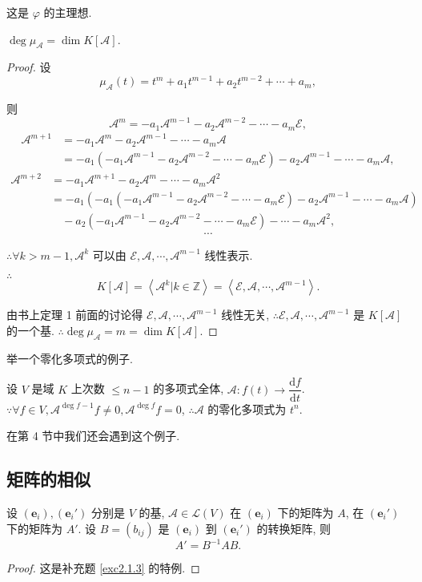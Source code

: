 \documentclass[color=black,device=normal,lang=cn,mode=geye]{elegantnote}
\begin{document}
这是 $\varphi$ 的主理想.
\begin{theorem}\label{t2.2}
    $\deg\mu_\mathcal{A}=\dim K[\mathcal{A}]$.
\end{theorem}
\begin{proof}
    设
    \[\mu_\mathcal{A}(t)=t^m+a_1t^{m-1}+a_2t^{m-2}+\cdots+a_m,\]

    则
    \[\mathcal{A}^m=-a_1\mathcal{A}^{m-1}-a_2\mathcal{A}^{m-2}-\cdots-a_m\mathcal{E},\]
    \begin{align*}
        \mathcal{A}^{m+1} & =-a_1\mathcal{A}^{m}-a_2\mathcal{A}^{m-1}-\cdots-a_m\mathcal{A} \\
        & =-a_1(-a_1\mathcal{A}^{m-1}-a_2\mathcal{A}^{m-2}-\cdots-a_m\mathcal{E})-a_2\mathcal{A}^{m-1}-\cdots-a_m\mathcal{A},
    \end{align*}
    \begin{align*}
        \mathcal{A}^{m+2} & =-a_1\mathcal{A}^{m+1}-a_2\mathcal{A}^m-\cdots-a_m\mathcal{A}^2 \\
        & =-a_1(-a_1(-a_1\mathcal{A}^{m-1}-a_2\mathcal{A}^{m-2}-\cdots-a_m\mathcal{E})-a_2\mathcal{A}^{m-1}-\cdots-a_m\mathcal{A}) \\
        & \quad-a_2(-a_1\mathcal{A}^{m-1}-a_2\mathcal{A}^{m-2}-\cdots-a_m\mathcal{E})-\cdots-a_m\mathcal{A^2},
    \end{align*}
    \[\cdots\]

    $\therefore\forall k>m-1,\mathcal{A}^k$ 可以由 $\mathcal{E},\mathcal{A},\cdots,\mathcal{A}^{m-1}$ 线性表示.

    $\therefore$
    \[K[\mathcal{A}]=\left<\mathcal{A}^k|k\in\mathbb{Z}\right>=\left<\mathcal{E},\mathcal{A},\cdots,\mathcal{A}^{m-1}\right>.\]

    由书上定理 1 前面的讨论得 $\mathcal{E},\mathcal{A},\cdots,\mathcal{A}^{m-1}$ 线性无关, $\therefore\mathcal{E},\mathcal{A},\cdots,\mathcal{A}^{m-1}$ 是 $K[\mathcal{A}]$ 的一个基. $\therefore\deg\mu_\mathcal{A}=m=\dim K[\mathcal{A}]$.
\end{proof}
举一个零化多项式的例子.
\begin{example}\label{exa2.3}
    设 $V$ 是域 $K$ 上次数 $\leq n-1$ 的多项式全体, $\mathcal{A}:f(t)\to\dfrac{\mathrm{d}f}{\mathrm{d}t}$. $\because\forall f\in V,\mathcal{A}^{\deg f-1}f\neq0,\mathcal{A}^{\deg f}f=0$, $\therefore\mathcal{A}$ 的零化多项式为 $t^n$.
\end{example}
在第 4 节中我们还会遇到这个例子.
\subsection{矩阵的相似}
\begin{theorem}[书上的定理 3]\label{t2.3}
    设 $(\boldsymbol{e}_i),(\boldsymbol{e}_i')$ 分别是 $V$ 的基, $\mathcal{A}\in\mathcal{L}(V)$ 在 $(\boldsymbol{e}_i)$ 下的矩阵为 $A$, 在 $(\boldsymbol{e}_i')$ 下的矩阵为 $A'$. 设 $B=(b_{ij})$ 是 $(\boldsymbol{e}_i)$ 到 $(\boldsymbol{e}_i')$ 的转换矩阵, 则
    \[A'=B^{-1}AB.\]
\end{theorem}
\begin{proof}
    这是补充题 \ref{exc2.1.3} 的特例.
\end{proof}
\end{document}
